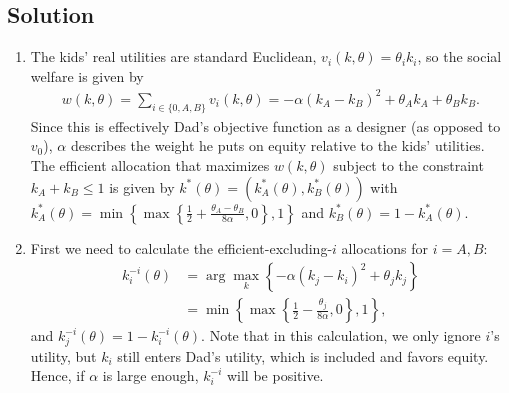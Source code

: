 \documentclass[a4paper]{article}
\newif\ifsolutions
\begin{document}
	
	
	\ifsolutions
	\subsection*{Solution}
	\begin{enumerate}
		\item The kids' real utilities are standard Euclidean, $v_i(k,\theta) = \theta_i k_i$, so the social welfare is given by 
		\begin{align*}
			w(k,\theta) = \sum_{i \in \{0,A,B\}} v_i(k,\theta) = -\alpha(k_A - k_B)^2 + \theta_A k_A + \theta_B k_B.
		\end{align*}
		Since this is effectively Dad's objective function as a designer (as opposed to $v_0$), $\alpha$ describes the weight he puts on equity relative to the kids' utilities. The efficient allocation that maximizes $w(k,\theta)$ subject to the constraint $k_A+k_B \leq 1$ is given by $k^*(\theta)=(k^*_A(\theta),k^*_B(\theta))$ with $k^*_A(\theta) = \min \left\{ \max \left\{ \frac{1}{2} + \frac{\theta_A - \theta_B}{8 \alpha}, 0 \right\}, 1 \right\}$  and $k^*_B(\theta) = 1 - k^*_A(\theta)$. 
		
		\item First we need to calculate the efficient-excluding-$i$ allocations for $i=A,B$:
		\begin{align*}
			k^{-i}_i(\theta) &= \arg \max_k \left\{ -\alpha(k_j - k_i)^2 + \theta_j k_j \right\}
			\\
			&= \min \left\{ \max \left\{ \frac{1}{2} - \frac{\theta_j}{8 \alpha}, 0 \right\}, 1 \right\},
		\end{align*}
		and $k^{-i}_j(\theta) = 1 - k^{-i}_i(\theta)$. Note that in this calculation, we only ignore $i$'s utility, but $k_i$ still enters Dad's utility, which is included and favors equity. Hence, if $\alpha$ is large enough, $k_i^{-i}$ will be positive.
		

\end{enumerate}
\end{document}
